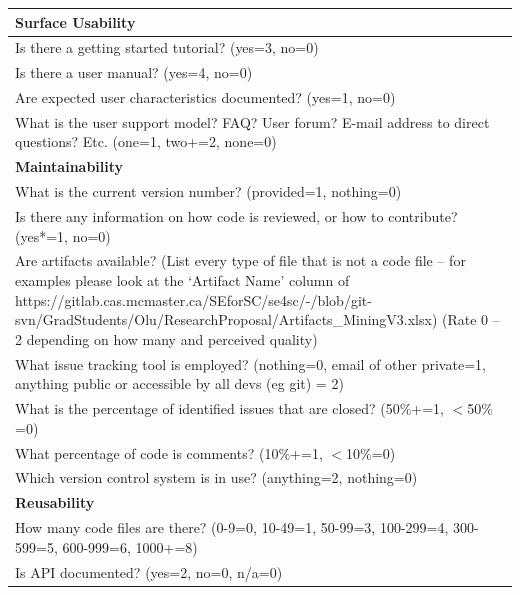 \documentclass[12pt, notitlepage]{article}
\begin{document}
\begin{appendices}
\begin{singlespace}
\def\arraystretch{1.4}
\begin{tabular}{p{14cm}}
		\hline		
	\textbf{Surface Usability}\\
	\hline
	Is there a getting started tutorial? ({yes=3, no=0})\\
	Is there a user manual? ({yes=4, no=0})\\
	Are expected user characteristics documented? ({yes=1, no=0})\\
	What is the user support model? FAQ? User forum? E-mail address to direct questions? Etc. (one=1, two+=2, none=0)\\
	\hline
	\textbf{Maintainability}\\
	\hline
	What is the current version number? (provided=1, nothing=0)\\
	Is there any information on how code is reviewed, or how to contribute? ({yes*=1, no=0})\\
	Are artifacts available? (List every type of file that is not a code file – for examples please look at the ‘Artifact Name’ column of https://gitlab.cas.mcmaster.ca/SEforSC/se4sc/-/blob/git-svn/GradStudents/Olu/ResearchProposal/Artifacts\_MiningV3.xlsx) (Rate 0 – 2 depending on how many and perceived quality)\\
	What issue tracking tool is employed? (nothing=0, email of other private=1, anything public or accessible by all devs (eg git) = 2)\\
	What is the percentage of identified issues that are closed? (50$\%$+=1, $<$50$\%$=0)\\
	What percentage of code is comments? (10$\%$+=1, $<$10$\%$=0)\\
	Which version control system is in use? (anything=2, nothing=0)\\
	\hline		
	\textbf{Reusability}\\
	\hline
	How many code files are there? (0-9=0, 10-49=1, 50-99=3, 100-299=4, 300-599=5, 600-999=6, 1000+=8)\\
	Is API documented? ({yes=2, no=0, n/a=0})\\
	\hline
\end{tabular}


\end{singlespace}
\end{appendices}
\end{document}
